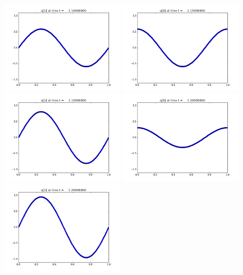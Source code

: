 \documentclass[11pt]{article}
\begin{document}
\includegraphics[width=0.475\textwidth]{frame0022fig1.png}
\vskip 10pt 
\includegraphics[width=0.475\textwidth]{frame0023fig0.png}
\includegraphics[width=0.475\textwidth]{frame0023fig1.png}
\vskip 10pt 
\includegraphics[width=0.475\textwidth]{frame0024fig0.png}
\includegraphics[width=0.475\textwidth]{frame0024fig1.png}
\end{document}
